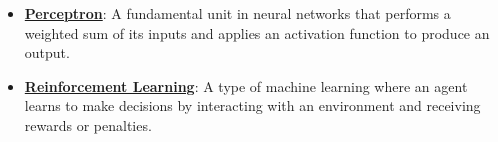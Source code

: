 \documentclass{article}%
\begin{document}
\begin{itemize}[leftmargin=*]
\item \href{\url{https://purdue.brightspace.com/d2l/common/assets/pdfjs-d2l-dist/1.0.14-legacy/web/viewer.html?file=\%252Fcontent\%252Fenforced\%252F1095467-wl.202510.CS.24300.001\%252F02L2-Intro.pdf\%253Fou\%253D1095467\&lang=en-us\&container=d2l-fileviewer-rendered-pdf\&fullscreen=d2l-fileviewer-rendered-pdf-dialog\&height=667}#page=45}{\textbf{Perceptron}}: A fundamental unit in neural networks that performs a weighted sum of its inputs and applies an activation function to produce an output.%
\item \href{\url{https://purdue.brightspace.com/d2l/common/assets/pdfjs-d2l-dist/1.0.14-legacy/web/viewer.html?file=\%252Fcontent\%252Fenforced\%252F1095467-wl.202510.CS.24300.001\%252F02L2-Intro.pdf\%253Fou\%253D1095467\&lang=en-us\&container=d2l-fileviewer-rendered-pdf\&fullscreen=d2l-fileviewer-rendered-pdf-dialog\&height=667}#page=46}{\textbf{Reinforcement Learning}}: A type of machine learning where an agent learns to make decisions by interacting with an environment and receiving rewards or penalties.%
\end{itemize}%
\end{document}
